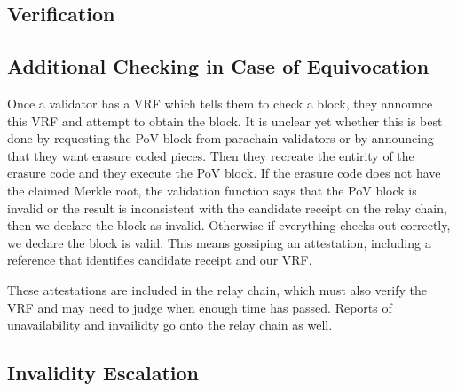 \subsection{Verification}


\subsection{Additional Checking in Case of Equivocation}\label{sect-equivocation-case}

Once a validator has a VRF which tells them to check a block, they announce this VRF and attempt to obtain the block. It is unclear yet whether this is best done by requesting the PoV block from parachain validators or by announcing that they want erasure coded pieces. Then they recreate the entirity of the erasure code and they execute the PoV block. If the erasure code does not have the claimed Merkle root, the validation function says that the PoV block is invalid or the result is inconsistent with the candidate receipt on the relay chain, then we declare the block as invalid. Otherwise if everything checks out correctly, we declare the block is valid. This means gossiping an attestation, including a reference that identifies candidate receipt and our VRF. 

These attestations are included in the relay chain, which must also verify the VRF and may need to judge when enough time has passed. Reports of unavailability and invailidty go onto the relay chain as well.

\subsection{Invalidity Escalation}\label{escalation}

